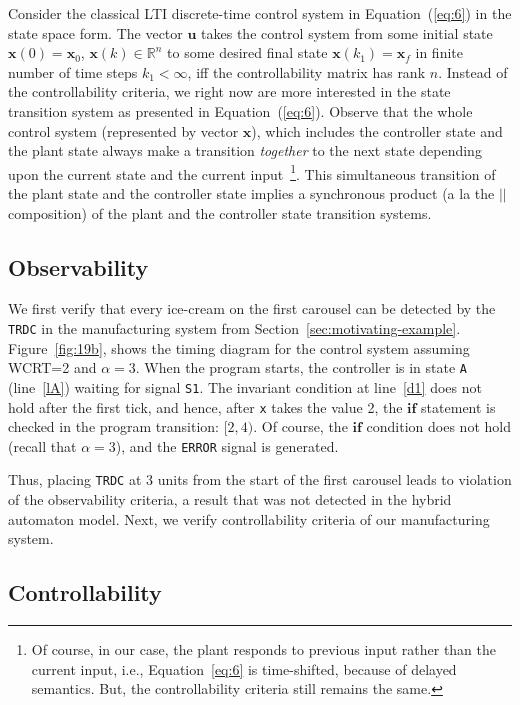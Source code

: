 \documentclass[10pt,journal,cspaper,compsoc]{IEEEtran}
\begin{document}
Consider the classical LTI discrete-time control system in
Equation~(\ref{eq:6}) in the state space form. The vector $\mathbf{u}$
takes the control system from some initial state
$\mathbf{x}(0) = \mathbf{x}_0$, $\mathbf{x}(k) \in \mathbb{R}^n$ to some
desired final state $\mathbf{x}(k_1) = \mathbf{x}_f$ in finite number of
time steps $k_1 < \infty$, \textrm{iff} the controllability matrix has
rank $n$. Instead of the controllability criteria, we right now are more
interested in the state transition system as presented in
Equation~(\ref{eq:6}). Observe that the whole control system
(represented by vector $\mathbf{x}$), which includes the controller
state and the plant state always make a transition \textit{together} to
the next state depending upon the current state and the current
input~\footnote{Of course, in our case, the plant responds to previous
  input rather than the current input, i.e., Equation~\ref{eq:6} is
  time-shifted, because of delayed semantics. But, the controllability
  criteria still remains the same.}. This simultaneous transition of the
plant state and the controller state implies a synchronous product (a la
the $||$ composition) of the plant and the controller state transition
systems.

\subsection{Observability}
\label{sec:observability}

We first verify that every ice-cream on the first carousel can be
detected by the \texttt{TRDC} in the manufacturing system from
Section~\ref{sec:motivating-example}. Figure~\ref{fig:19b}, shows the
timing diagram for the control system assuming WCRT=2 and
$\alpha=3$. When the program starts, the controller is in state
\texttt{A} (line~\ref{lA}) waiting for signal \texttt{S1}. The invariant
condition at line~\ref{d1} does not hold after the first tick, and
hence, after \texttt{x} takes the value 2, the $\mathbf{if}$ statement
is checked in the program transition: $[2,4)$. Of course, the
$\mathbf{if}$ condition does not hold (recall that $\alpha = 3$), and
the \texttt{ERROR} signal is generated.

Thus, placing \texttt{TRDC} at 3 units from the start of the first
carousel leads to violation of the observability criteria, a result that
was not detected in the hybrid automaton model. Next, we verify
controllability criteria of our manufacturing system.

\subsection{Controllability}
\label{sec:controllability}
\end{document}
